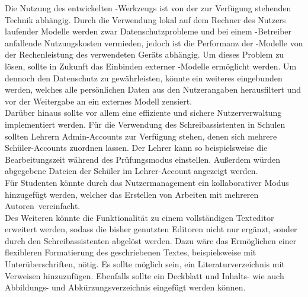 \documentclass[../main.tex]{subfiles}
\begin{document}
Die Nutzung des entwickelten -Werkzeugs ist von der zur Verfügung stehenden Technik abhängig. Durch die Verwendung lokal auf dem Rechner des Nutzers laufender Modelle werden zwar 
Datenschutzprobleme und bei einem -Betreiber anfallende Nutzungskosten vermieden, jedoch ist die Performanz der -Modelle von der Rechenleistung des verwendeten Geräts abhängig. 
Um dieses Problem zu lösen, sollte in Zukunft das Einbinden externer -Modelle ermöglicht werden. Um dennoch den Datenschutz zu gewährleisten, könnte ein weiteres 
eingebunden werden, welches alle persönlichen Daten aus den Nutzerangaben herausfiltert und vor der Weitergabe an ein externes Modell zensiert.\\ 
Darüber hinaus sollte vor allem eine effiziente und sichere Nutzerverwaltung implementiert werden. Für die Verwendung des Schreibassistenten in Schulen sollten Lehrern Admin-Accounts 
zur Verfügung stehen, denen sich mehrere Schüler-Accounts zuordnen lassen. Der Lehrer kann so beispielsweise die Bearbeitungszeit während des Prüfungsmodus einstellen. Außerdem 
würden abgegebene Dateien der Schüler im Lehrer-Account angezeigt werden.\\
Für Studenten könnte durch das Nutzermanagement ein kollaborativer Modus hinzugefügt werden, welcher das Erstellen von Arbeiten mit mehreren \mbox{Autoren vereinfacht.}\\
Des Weiteren könnte die Funktionalität zu einem vollständigen Texteditor erweitert werden, sodass die bisher genutzten Editoren nicht nur ergänzt, sonder durch den Schreibassistenten 
abgelöst werden. Dazu wäre das Ermöglichen einer flexibleren Formatierung des geschriebenen Textes, beispielsweise mit Unterüberschriften, nötig. Es sollte möglich sein, ein 
Literaturverzeichnis mit Verweisen hinzuzufügen. Ebenfalls sollte ein Deckblatt und Inhalts- wie auch Abbildungs- und Abkürzungsverzeichnis eingefügt werden können.
\end{document}
